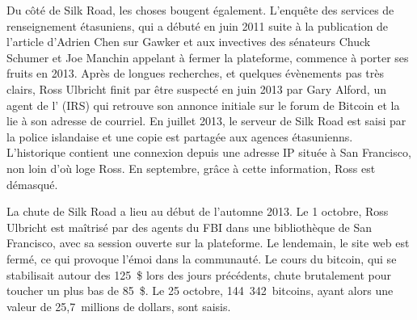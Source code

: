 Du côté de Silk Road, les choses bougent également. L'enquête des services de renseignement étasuniens, qui a débuté en juin 2011 suite à la publication de l'article d'Adrien Chen sur Gawker et aux invectives des sénateurs Chuck Schumer et Joe Manchin appelant à fermer la plateforme, commence à porter ses fruits en 2013. Après de longues recherches, et quelques évènements pas très clairs, Ross Ulbricht finit par être suspecté en juin 2013 par Gary Alford, un agent de l' (IRS) qui retrouve son annonce initiale sur le forum de Bitcoin et la lie à son adresse de courriel. En juillet 2013, le serveur de Silk Road est saisi par la police islandaise et une copie est partagée aux agences étasunienns. L'historique contient une connexion depuis une adresse IP située à San Francisco, non loin d'où loge Ross. En septembre, grâce à cette information, Ross est démasqué.

La chute de Silk Road a lieu au début de l'automne 2013. Le 1\ier{} octobre, Ross Ulbricht est maîtrisé par des agents du FBI dans une bibliothèque de San Francisco, avec sa session ouverte sur la plateforme. Le lendemain, le site web est fermé, ce qui provoque l'émoi dans la communauté. Le cours du bitcoin, qui se stabilisait autour des 125~\$ lors des jours précédents, chute brutalement pour toucher un plus bas de 85~\$. Le 25 octobre, 144~342~bitcoins, ayant alors une valeur de 25,7~millions de dollars, sont saisis.

